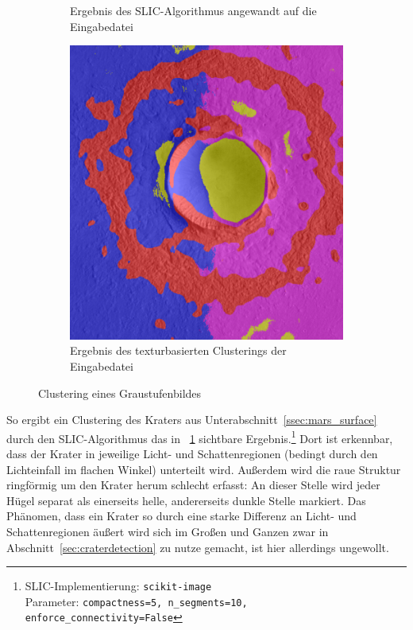 \begin{figure}[h!]
\begin{subfigure}[t]{0.32\textwidth}
		\captionsetup{format=plain,width=0.85\textwidth}
		\caption{Ergebnis des SLIC-Algorithmus angewandt auf die Eingabedatei}
		\label{fig:slic_vs_tsugf_slic}
	\end{subfigure}
	\hfill
	\begin{subfigure}[t]{0.32\textwidth}
		\centering
		\includegraphics[width=\textwidth,keepaspectratio]{images/gen/GEN_slic_vs_tsugf_02.png}
		\captionsetup{format=plain,width=0.85\textwidth}
		\caption{Ergebnis des texturbasierten Clusterings der Eingabedatei}
		\label{fig:slic_vs_tsugf_tsugf}
	\end{subfigure}
	\caption{Clustering eines Graustufenbildes}
\end{figure}

So ergibt ein Clustering des Kraters aus Unterabschnitt~\ref{ssec:mars_surface} durch den SLIC-Algorithmus \cite{achanta_10} das in \figurename~\ref{fig:slic_vs_tsugf_slic} sichtbare Ergebnis.\footnote{SLIC-Implementierung: \texttt{scikit-image}\\Parameter: \texttt{compactness=5, n\_segments=10, enforce\_connectivity=False}} Dort ist erkennbar, dass der Krater in jeweilige Licht- und Schattenregionen (bedingt durch den Lichteinfall im flachen Winkel) unterteilt wird. Außerdem wird die raue Struktur ringförmig um den Krater herum schlecht erfasst: An dieser Stelle wird jeder Hügel separat als einerseits helle, andererseits dunkle Stelle markiert. Das Phänomen, dass ein Krater so durch eine starke Differenz an Licht- und Schattenregionen äußert wird sich im Großen und Ganzen zwar in Abschnitt~\ref{sec:craterdetection} zu nutze gemacht, ist hier allerdings ungewollt.

